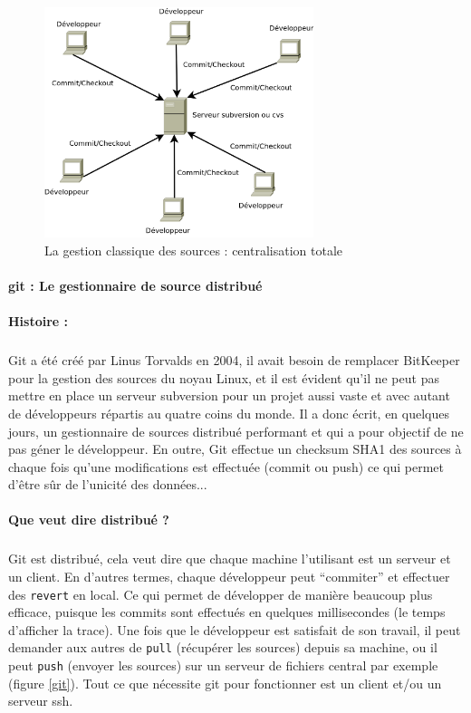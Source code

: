 \begin{figure}[!ht]
\begin{center}
        \includegraphics[width=0.7\textwidth]{./schema/svn.png}
\caption{La gestion classique des sources : centralisation totale }
\label{svn}
\end{center}
\end{figure}


\paragraph{git : Le gestionnaire de source distribué}
\label{gitPar}
\paragraph{Histoire :}
\subparagraph{} Git a été créé par Linus Torvalds en 2004, il avait besoin de remplacer BitKeeper pour la gestion des sources du noyau Linux, et il est évident qu'il ne peut pas mettre en place un serveur subversion pour un projet aussi vaste et avec autant de développeurs répartis au quatre coins du monde. Il a donc écrit, en quelques jours, un gestionnaire de sources distribué performant et qui a pour objectif de ne pas géner le développeur. En outre, Git effectue un checksum SHA1 des sources à chaque fois qu'une modifications est effectuée (commit ou push) ce qui permet d'être sûr de l'unicité des données...

\paragraph{Que veut dire distribué ?} 
\subparagraph{}Git est distribué, cela veut dire que chaque machine l'utilisant est un serveur et un client. En d'autres termes, chaque développeur peut ``commiter'' et effectuer des \verb|revert| en local. Ce qui permet de développer de manière beaucoup plus efficace, puisque les commits sont effectués en quelques millisecondes (le temps d'afficher la trace). Une fois que le développeur est satisfait de son travail, il peut demander aux autres de \verb|pull| (récupérer les sources) depuis sa machine, ou il peut \verb|push| (envoyer les sources) sur un serveur de fichiers central par exemple (figure \ref{git}). Tout ce que nécessite git pour fonctionner est un client et/ou un serveur ssh.


